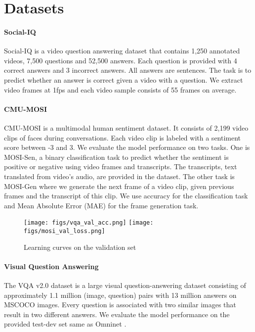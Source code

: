 \documentclass{article}
\begin{document}
\section{Datasets}\label{sec:datasets}

\paragraph{Social-IQ} Social-IQ \cite{zadeh2019social} is a video question answering dataset that contains 1,250 annotated videos, 7,500 questions and 52,500 answers. Each question is provided with 4 correct answers and 3 incorrect answers. All answers are sentences. The task is to predict whether an answer is correct given a video with a question. We extract video frames at 1fps \cite{zadeh2019social} and each video sample consists of 55 frames on average. 

\paragraph{CMU-MOSI} CMU-MOSI \cite{zadeh2016multimodal} is a multimodal human sentiment dataset. It consists of 2,199 video clips of faces during conversations. Each video clip is labeled with a sentiment score between -3 and 3. We evaluate the model performance on two tasks. One is MOSI-Sen, a binary classification task to predict whether the sentiment is positive or negative using video frames and transcripts. The transcripts, text translated from video's audio, are provided in the dataset. The other task is MOSI-Gen where we generate the next frame of a video clip, given previous frames and the transcript of this clip. We use accuracy for the classification task and Mean Absolute Error (MAE) for the frame generation task. 


\begin{figure}
    \centering
    \captionsetup{justification=centering}

    \texttt{[image: figs/vqa\_val\_acc.png]}
    \texttt{[image: figs/mosi\_val\_loss.png]}
    
    \caption{Learning curves on the validation set}
    \label{fig:val_compare}
\end{figure}


\paragraph{Visual Question Answering} The VQA v2.0 dataset \cite{goyal2017making} is a large visual question-answering dataset consisting of approximately 1.1 million (image, question) pairs with 13 million answers on MSCOCO images. Every question is associated with two similar images that result in two different answers. We evaluate the model performance on the provided test-dev set same as Omninet \cite{pramanik2019omninet}. 
\end{document}
